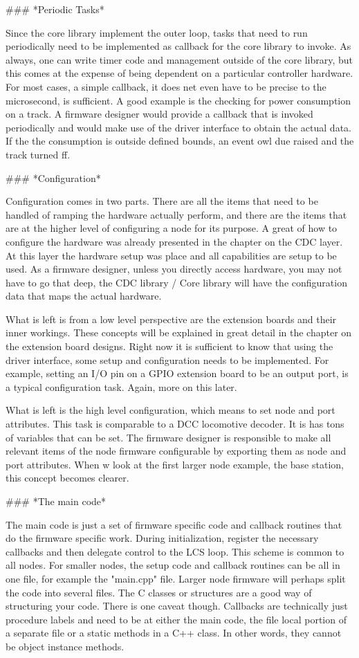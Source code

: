 ### *Periodic Tasks*

Since the core library implement the outer loop, tasks that need to run periodically need to be implemented as callback for the core library to invoke. As always, one can write timer code and management outside of the core library, but this comes at the expense of being dependent on a particular controller hardware. For most cases, a simple callback, it does net even have to be precise to the microsecond, is sufficient. A good example is the checking for power consumption on a track. A firmware designer would provide a callback that is invoked periodically and would make use of the driver interface to obtain the actual data. If the the consumption is outside defined bounds, an event owl  due raised and the track turned ff. 

### *Configuration*

Configuration comes in two parts. There are all the items that need to be handled of ramping the hardware actually perform, and there are the items that are at the higher level of configuring a node for its purpose. A great of how to configure the hardware was already presented in the chapter on the CDC layer. At this layer the hardware setup was place and all capabilities are setup to be used. As a firmware designer, unless you directly access hardware, you may not have to go that deep, the CDC library / Core library will have the configuration data that maps the actual hardware. 

What is left is from a low level perspective are the extension boards and their inner workings. These concepts will be explained in great detail in the chapter on the extension board designs. Right now it is sufficient to know that using the driver interface, some setup and configuration needs to be implemented. For example, setting an I/O pin on a GPIO extension board to be an output port, is a typical configuration task. Again, more on this later.

What is left is the high level configuration, which means to set node and port attributes. This task is comparable to a DCC locomotive decoder. It is has tons of variables  that can be set. The firmware designer is responsible to make all relevant items of the node firmware configurable by exporting them as node and port attributes. When w look at the first larger node example, the base station, this concept becomes clearer.

### *The main code*

The main code is just a set of firmware specific code and callback routines that do the firmware specific work. During initialization, register the necessary callbacks and then delegate control to the LCS loop. This scheme is common to all nodes. For smaller nodes, the setup code and callback routines can be all in one file, for example the "main.cpp" file. Larger node firmware will perhaps split the code into several files. The C\+\+ classes or structures are a good way of structuring your code. There is one caveat though. Callbacks are technically just procedure labels and need to be at either the main code, the file local portion of a separate file or a static methods in a C++ class. In other words, they cannot be object instance methods.

